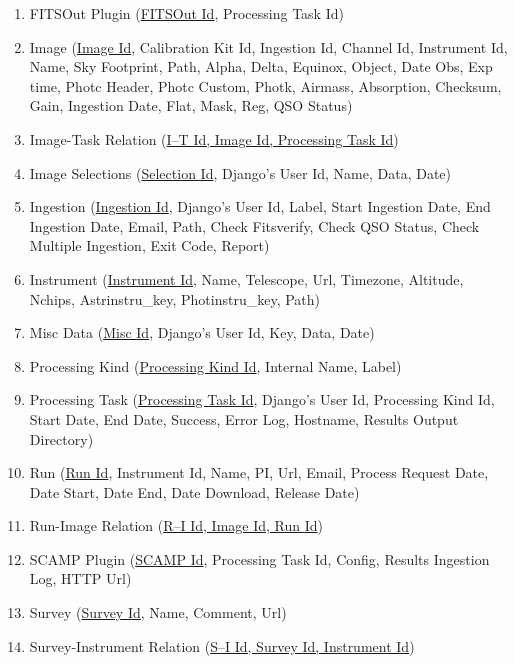 \documentclass[twoside,a4paper]{article}
\begin{document}
\begin{enumerate}
\item FITSOut Plugin (\underline{FITSOut Id}, Processing Task Id)
\item Image (\underline{Image Id}, Calibration Kit Id, Ingestion Id, Channel Id, Instrument Id, Name, Sky Footprint, Path, Alpha, Delta, Equinox, Object, Date Obs, Exp time, Photc Header, Photc Custom, Photk, Airmass, Absorption, Checksum, Gain, Ingestion Date, Flat, Mask, Reg, QSO Status)
\item Image-Task Relation (\underline{I--T Id, Image Id, Processing Task Id}) 
\item Image Selections (\underline{Selection Id}, Django's User Id, Name, Data, Date)
\item Ingestion (\underline{Ingestion Id}, Django's User Id, Label, Start Ingestion Date, End Ingestion Date, Email, Path, Check Fitsverify, Check QSO Status, Check Multiple Ingestion, Exit Code, Report)
\item Instrument (\underline{Instrument Id}, Name, Telescope, Url, Timezone, Altitude, Nchips, Astrinstru\_key, Photinstru\_key, Path)
\item Misc Data (\underline{Misc Id}, Django's User Id, Key, Data, Date)
\item Processing Kind (\underline{Processing Kind Id}, Internal Name, Label)
\item Processing Task (\underline{Processing Task Id}, Django's User Id, Processing Kind Id, Start Date, End Date, Success, Error Log, Hostname, Results Output Directory)
\item Run (\underline{Run Id}, Instrument Id, Name, PI, Url, Email, Process Request Date, Date Start, Date End, Date Download, Release Date)
\item Run-Image Relation (\underline{R--I Id, Image Id, Run Id}) 
\item SCAMP Plugin (\underline{SCAMP Id}, Processing Task Id, Config, Results Ingestion Log, HTTP Url)
\item Survey (\underline{Survey Id}, Name, Comment, Url)
\item Survey-Instrument Relation (\underline{S--I Id, Survey Id, Instrument Id}) 
\end{enumerate}
\end{document}
